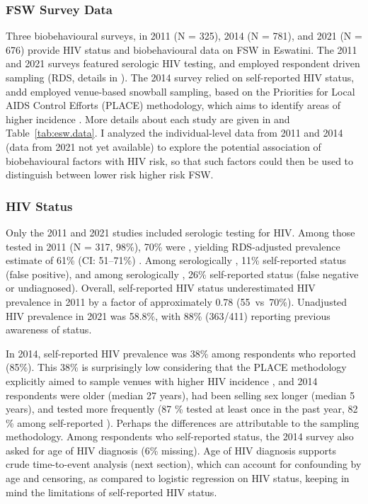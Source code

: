 \subsubsection{FSW Survey Data}\label{model.par.fsw.data}
Three biobehavioural surveys, in
2011 \cite{Baral2014} (N = 325),
2014 \cite{EswKP2014} (N = 781), and
2021 \cite{EswIBBS2022} (N = 676)
provide HIV status and biobehavioural data on FSW in Eswatini.
The 2011 and 2021 surveys featured serologic HIV testing,
and employed respondent driven sampling (RDS, details in \cite{Yam2013}).
The 2014 survey relied on self-reported HIV status,
andd employed venue-based snowball sampling, based on the
Priorities for Local AIDS Control Efforts (PLACE) methodology,
which aims to identify areas of higher incidence \cite{Weir2005}.
More details about each study are given in  and Table~\ref{tab:esw.data}.
I analyzed the individual-level data from 2011 and 2014 (data from 2021 not yet available)
to explore the potential association of biobehavioural factors with HIV risk,
so that such factors could then be used to distinguish between
lower risk \vs higher risk FSW.
\subsubsection{HIV Status}\label{model.par.fsw.hiv}
Only the 2011 and 2021 studies included serologic testing for HIV.
Among those tested in 2011 (N = 317, 98\%), 70\% were \hivp,
yielding RDS-adjusted prevalence estimate of 61\% (CI: 51--71\%) \cite{Baral2014}.
Among serologically \hivn, 11\% self-reported \hivp status (false positive), and
among serologically \hivp, 26\% self-reported \hivn status (false negative or undiagnosed).
Overall, self-reported HIV status underestimated HIV prevalence in 2011
by a factor of approximately 0.78 (55~vs~70\%).
Unadjusted HIV prevalence in 2021 was 58.8\%,
with 88\% (363/411) reporting previous awareness of \hivp status.
\par
In 2014, self-reported HIV prevalence was 38\% among respondents who reported (85\%).
This 38\% is surprisingly low considering that
the PLACE methodology explicitly aimed to sample venues
with higher HIV incidence \cite{Weir2005}, and 2014  respondents
were older (median 27  years), %
had been selling sex longer (median 5  years), %
and tested more frequently (87 \% tested at least once in the past year, %
82 \% among self-reported \hivn).
Perhaps the differences are attributable to the sampling methodology.
Among respondents who self-reported \hivp status,
the 2014 survey also asked for age of HIV diagnosis (6\% missing).
Age of HIV diagnosis supports crude time-to-event analysis (next section),
which can account for confounding by age and censoring,
as compared to logistic regression on HIV status,
keeping in mind the limitations of self-reported HIV status.
